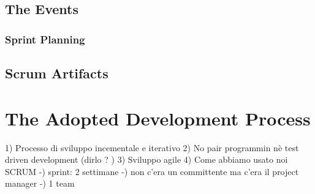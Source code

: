 		\subsection{The Events}	
			\subsubsection{Sprint Planning}
		
		\subsection{Scrum Artifacts}

	
	
	\section{The Adopted Development Process}
		1) Processo di sviluppo incementale e iterativo
		2) No pair programmin nè test driven development  (dirlo ? )
		3) Sviluppo agile
		4) Come abbiamo usato noi SCRUM
			-) sprint: 2 settimane
			-) non c'era un committente ma c'era il project manager
			-) 1 team

\begin{comment}
	\section{SCRUM}

	\section{Working Instruments}
	In addition to ACT-R and OpenCV, many other tools have been used. Here follows a list of the most important ones.
		\begin{itemize}
		\item \textbf{Eclipse IDE for C/C++ Developers} as \textit{integrated development environment} \footnote{More informations at \url{www.eclipse.org}};
		\item \textbf{Cute} as \textit{unit testing framework} \footnote{More informations at \url{http://cute-test.com}};
		\item \textbf{Mylyn} as \textit{task and application lifecycle management} \footnote{More informations at \url{www.eclipse.org/mylyn}};
		\item \textbf{Trac} as \textit{bug tracking system} \footnote{More informations at \url{trac.edgewall.org}};
		\item \textbf{Git} as \textit{version control system} \footnote{More informations at \url{git-scm.com}}; 
		\item \textbf{Dia} and \textbf{cpp2dia} to create UML diagrams \footnote{More informations at \url{dia-installer.de} and at \url{cpp2dia.sourceforge.net}};
		\item \textbf{ZBar} to read QR codes \footnote{More informations at \url{zbar.sourceforge.net}}.
		\end{itemize}
\end{comment}
